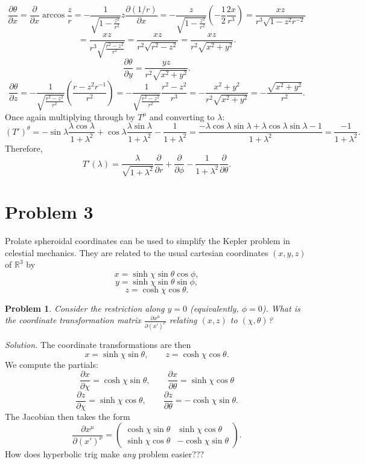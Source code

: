 \documentclass[11pt, letterpaper]{article}
\theoremstyle{plain}
\newtheorem{problem}{Problem}[section]
\begin{document}
\[
	\frac{\partial \theta }{\partial x} =\frac{\partial }{\partial x} \arccos \frac{z}{r} =-\frac{1}{\sqrt{1-\frac{z^2}{r^2} } } z \frac{\partial (1/r)}{\partial x} =-\frac{z}{\sqrt{1-\frac{z^2}{r^2} } } \left( -\frac{1}{2} \frac{2x}{r^3}  \right) =\frac{xz}{r^3\sqrt{1-z^2r^{-2} } } 
\]
\[
	=\frac{xz}{r^3 \sqrt{\frac{r^2-z^2}{r^2} } } =\frac{xz}{r^2 \sqrt{r^2-z^2} } =\frac{xz}{r^2\sqrt{x^2+y^2} } 
.\]
\[
	\frac{\partial \theta }{\partial y} =\frac{yz}{r^2\sqrt{x^2+y^2} } 
.\]
\[
	\frac{\partial \theta }{\partial z} =-\frac{1}{\sqrt{\frac{r^2-z^2}{r^2}} } \left( \frac{r-z^2r^{-1} }{r^2}  \right) =-\frac{1}{\sqrt{\frac{r^2-z^2}{r^2} } } \frac{r^2-z^2}{r^3} =-\frac{x^2+y^2}{r^2\sqrt{x^2+y^2} }=-\frac{\sqrt{x^2+y^2} }{r^2} 
.\]
Once again multiplying through by $T^\mu $ and converting to $\lambda $:
\[
	(T')^\theta =-\sin \lambda \frac{\lambda \cos \lambda }{1+\lambda ^2 }+\cos \lambda \frac{\lambda \sin \lambda }{1+\lambda ^2} -\frac{1}{1+\lambda ^2} =\frac{-\lambda \cos \lambda \sin \lambda +\lambda \cos \lambda \sin \lambda -1}{1+\lambda ^2} =\frac{-1}{1+\lambda ^2} 
.\]
Therefore,
\[
	T'(\lambda )=\frac{\lambda }{\sqrt{1+\lambda ^2} } \frac{\partial }{\partial r} +\frac{\partial }{\partial \phi } -\frac{1}{1+\lambda ^2} \frac{\partial }{\partial \theta } 
.\]

\section{Problem 3}

Prolate spheroidal coordinates can be used to simplify the Kepler problem in celestial mechanics. They are related to the usual cartesian coordinates $(x,y,z)$ of $\mathbb{R} ^3$ by
\[
	x=\sinh\chi \sin \theta \cos \phi ,
\]
\[
	y=\sinh\chi \sin \theta \sin \phi ,
\]
\[
	z=\cosh\chi \cos \theta 
.\]
\begin{problem}
	Consider the restriction along $y=0$ (equivalently, $\phi =0$). What is the coordinate transformation matrix $\frac{\partial x^\mu }{\partial (x')^\nu } $ relating $(x,z)$ to $(\chi ,\theta )$?
\end{problem}
\noindent\emph{Solution.} The coordinate transformations are then
\[
	x=\sinh \chi \sin \theta ,\qquad z=\cosh\chi \cos \theta 
.\]
We compute the partials:
\[
	\frac{\partial x}{\partial \chi } =\cosh \chi \sin \theta,\qquad \frac{\partial x}{\partial \theta } =\sinh \chi \cos \theta 
\]
\[
	\frac{\partial z}{\partial \chi } =\sinh \chi \cos \theta ,\qquad \frac{\partial z}{\partial \theta } =-\cosh \chi \sin \theta 
.\]
The Jacobian then takes the form
\[
	\frac{\partial x^\mu }{\partial (x')^\nu }=\begin{pmatrix}
	\cosh\chi \sin \theta  & \sinh\chi \cos \theta  \\
	\sinh\chi \cos \theta  & -\cosh\chi \sin \theta
	\end{pmatrix}
.\]
How does hyperbolic trig make \emph{any} problem easier???
\end{document}
